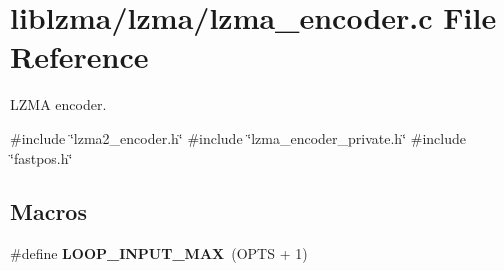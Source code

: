 \section{liblzma/lzma/lzma\+\_\+encoder.c File Reference}
\label{lzma__encoder_8c}


L\+Z\+MA encoder.  


{\ttfamily \#include \char`\"{}lzma2\+\_\+encoder.\+h\char`\"{}}\newline
{\ttfamily \#include \char`\"{}lzma\+\_\+encoder\+\_\+private.\+h\char`\"{}}\newline
{\ttfamily \#include \char`\"{}fastpos.\+h\char`\"{}}\newline
\subsection*{Macros}
\begin{DoxyCompactItemize}
\item 
\#define \textbf{ L\+O\+O\+P\+\_\+\+I\+N\+P\+U\+T\+\_\+\+M\+AX}~(O\+P\+TS + 1)
\end{DoxyCompactItemize}
